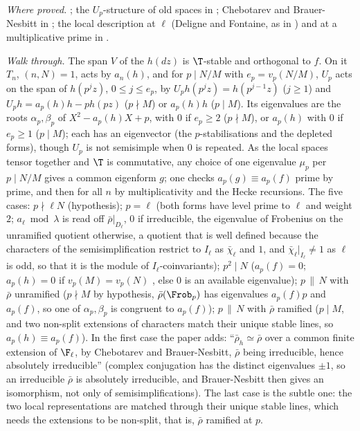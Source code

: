 \begin{sloppypar}
\noindent\emph{Where proved.} ; the $U_p$-structure of old spaces in ; Chebotarev and Brauer-Nesbitt in ; the local
description at $\ell$ (Deligne and Fontaine, as in \cite[Section 2]{Edixhoven92}) and at a multiplicative prime \cite[Theorem 3.1(e)]{DDT} in .

\emph{Walk through.} The span $V$ of the $h(dz)$ is $\T$-stable and orthogonal to $f$. On it $T_n$, $(n,N)=1$, acts by $a_n(h)$, and for $p\mid N/M$ with $e_p=v_p(N/M)$, $U_p$ acts on
the span of $h(p^jz)$, $0\le j\le e_p$, by $U_ph(p^jz)=h(p^{j-1}z)$ ($j\ge1$) and $U_ph=a_p(h)h-ph(pz)$ ($p\nmid M$) or $a_p(h)h$ ($p\mid M$). Its eigenvalues are the roots $\alpha_p,\beta_p$ of
$X^2-a_p(h)X+p$, with $0$ if $e_p\ge2$ ($p\nmid M$), or $a_p(h)$ with $0$ if $e_p\ge1$ ($p\mid M$); each has an eigenvector (the $p$-stabilisations and the depleted forms), though
$U_p$ is not semisimple when $0$ is repeated. As the local spaces tensor together and $\T$ is commutative, any choice of one eigenvalue $\mu_p$ per $p\mid N/M$ gives a
common eigenform $g$; one checks $a_p(g)\equiv a_p(f)$ prime by prime, and then for all $n$ by multiplicativity and the Hecke recursions. The five cases: $p\nmid\ell N$
(hypothesis); $p=\ell$ (both forms have level prime to $\ell$ and weight $2$; $a_\ell\bmod\lambda$ is read off $\bar\rho|_{D_\ell}$, $0$ if irreducible, the eigenvalue of Frobenius on the unramified quotient otherwise, a quotient that is well defined because the characters of the semisimplification restrict to $I_\ell$ as $\bar\chi_\ell$ and $1$, and
$\bar\chi_\ell|_{I_\ell}\ne1$ as $\ell$ is odd, so that it is the module of $I_\ell$-coinvariants);
$p^2\mid N$ ($a_p(f)=0$; $a_p(h)=0$ if $v_p(M)=v_p(N)$ \cite[Theorem 3]{AtkinLehner70}, else $0$ is an available eigenvalue); $p\,\|\,N$ with $\bar\rho$ unramified ($p\nmid M$ by hypothesis,
$\bar\rho(\Frob_p)$ has eigenvalues $a_p(f)p$ and $a_p(f)$, so one of $\alpha_p,\beta_p$ is congruent to $a_p(f)$); $p\,\|\,N$ with $\bar\rho$ ramified ($p\mid M$, and two non-split extensions
of characters match their unique stable lines, so $a_p(h)\equiv a_p(f)$). In the first case the paper adds: ``$\bar\rho_h\simeq\bar\rho$
over a common finite extension of $\F_\ell$, by Chebotarev and Brauer-Nesbitt, $\bar\rho$ being irreducible, hence absolutely irreducible'' (complex conjugation has the
distinct eigenvalues $\pm1$, so an irreducible $\bar\rho$ is absolutely irreducible, and Brauer-Nesbitt then gives an isomorphism, not only of semisimplifications). The last case is the subtle one: the two local representations are matched through their
unique stable lines, which needs the extensions to be non-split, that is, $\bar\rho$ ramified at $p$.


\end{sloppypar}

